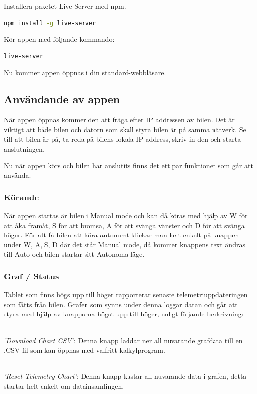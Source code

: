 \documentclass[10pt,oneside,swedish]{lips}
\begin{document}
\noindent
Installera paketet Live-Server med npm.
\begin{lstlisting}[language=sh,frame=single]
npm install -g live-server
\end{lstlisting}


\noindent
Kör appen med följande kommando:
\begin{lstlisting}[language=sh,frame=single]
live-server
\end{lstlisting}
Nu kommer appen öppnas i din standard-webbläsare.

\cleardoublepage
\subsection{Användande av appen}

\noindent
När appen öppnas kommer den att fråga efter IP addressen av bilen. 
Det är viktigt att både bilen och datorn som skall styra bilen är på samma nätverk.
Se till att bilen är på, ta reda på bilens lokala IP address, skriv in den och starta anslutningen.

\noindent
Nu när appen körs och bilen har anslutits finns det ett par funktioner som går att använda.

\subsubsection{Körande}
När appen startas är bilen i Manual mode och kan då köras med hjälp av W för att åka framåt,
S för att bromsa, A för att svänga vänster och D för att svänga höger. 
För att få bilen att köra autonomt klickar man helt enkelt på knappen under W, A, S, D 
där det står Manual mode, då kommer knappens text ändras till Auto och bilen startar sitt
Autonoma läge.

\subsubsection{Graf / Status}
Tablet som finns högs upp till höger rapporterar senaste telemetriuppdateringen som fåtts från bilen. Grafen som synns under denna loggar  datan och går att styra med hjälp av knapparna högst upp till höger, enligt följande beskrivning:

\noindent \\
\emph{'Download Chart CSV'}: Denna knapp laddar ner all nuvarande grafdata till en .CSV fil som kan öppnas med valfritt kalkylprogram.

\noindent \\
\emph{'Reset Telemetry Chart'}: Denna knapp kastar all nuvarande data i grafen, detta startar helt enkelt om datainsamlingen.
\end{document}
